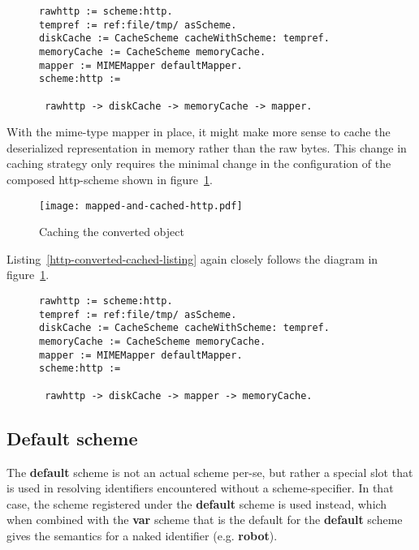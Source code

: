 \documentclass[preprint,authoryear]{acm_proc_article-sp}
\begin{document}
\begin{figure}[htbp]
\begin{lstlisting}[style=L,label=http-cached-converted-listing,caption=Caching and converting.]
rawhttp := scheme:http.
tempref := ref:file/tmp/ asScheme.
diskCache := CacheScheme cacheWithScheme: tempref.
memoryCache := CacheScheme memoryCache.
mapper := MIMEMapper defaultMapper.
scheme:http := 

 rawhttp -> diskCache -> memoryCache -> mapper.
\end{lstlisting}
\end{figure}


With the mime-type mapper in place, it might make more sense to
cache the deserialized representation in memory rather than
the raw bytes.  This change in caching strategy only requires
the minimal change in the configuration of the composed http-scheme
shown in figure~\ref{http-converted-cached}.

\begin{figure}[htbp]
\caption{Caching the converted object}
\label{http-converted-cached}
\begin{center}
\texttt{[image: mapped-and-cached-http.pdf]}
\end{center}
\end{figure}

Listing~\ref{http-converted-cached-listing} again closely follows the
diagram in figure~\ref{http-converted-cached}.

\begin{figure}[htbp]
\begin{lstlisting}[style=L,label=http-converted-cached-listing,caption=Converting and caching.]
rawhttp := scheme:http.
tempref := ref:file/tmp/ asScheme.
diskCache := CacheScheme cacheWithScheme: tempref.
memoryCache := CacheScheme memoryCache.
mapper := MIMEMapper defaultMapper.
scheme:http := 

 rawhttp -> diskCache -> mapper -> memoryCache.
\end{lstlisting}
\end{figure}


\subsection{Default scheme}


The {\bf default} scheme is not an actual scheme per-se, but rather a special slot
that is used in resolving identifiers encountered without a scheme-specifier.
In that case, the scheme registered under the {\bf default} scheme is used
instead, which when combined with the {\bf var} scheme that is the default
for the {\bf default} scheme gives the semantics for a naked identifier (e.g. {\bf robot}).
\end{document}

